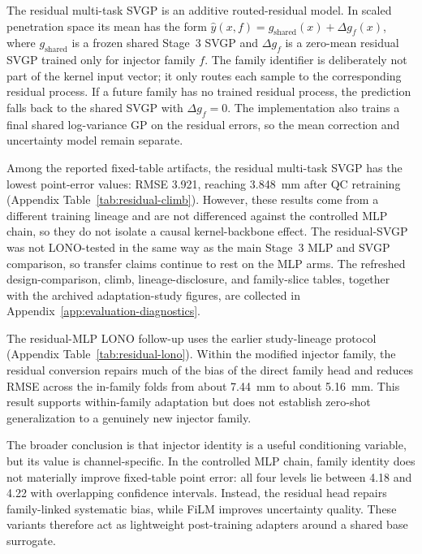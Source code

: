 The residual multi-task SVGP is an additive routed-residual model. In scaled
penetration space its mean has the form
\(\hat{y}(x,f)=g_{\mathrm{shared}}(x)+\Delta g_f(x)\), where
\(g_{\mathrm{shared}}\) is a frozen shared Stage~3 SVGP and \(\Delta g_f\) is a
zero-mean residual SVGP trained only for injector family \(f\). The family
identifier is deliberately not part of the kernel input vector; it only routes
each sample to the corresponding residual process. If a future family has no
trained residual process, the prediction falls back to the shared SVGP with
\(\Delta g_f=0\). The implementation also trains a final shared log-variance GP
on the residual errors, so the mean correction and uncertainty model remain
separate.

Among the reported fixed-table artifacts, the residual multi-task SVGP has the
lowest point-error values: RMSE 3.921, reaching \SI{3.848}{mm} after QC
retraining (Appendix Table~\ref{tab:residual-climb}). However, these results
come from a different training lineage and are not differenced against the
controlled MLP chain, so they do not isolate a causal kernel-backbone effect.
The residual-SVGP was not LONO-tested in the
same way as the main Stage~3 MLP and SVGP comparison, so transfer claims
continue to rest on the MLP arms. The refreshed design-comparison, climb,
lineage-disclosure, and family-slice tables, together with the archived
adaptation-study figures, are collected in
Appendix~\ref{app:evaluation-diagnostics}.

The residual-MLP LONO follow-up uses the earlier study-lineage protocol
(Appendix Table~\ref{tab:residual-lono}). Within the modified injector family,
the residual conversion repairs much of the bias of the direct family head and
reduces RMSE across the in-family folds from about \SI{7.44}{mm} to about
\SI{5.16}{mm}. This result supports within-family adaptation but does not
establish zero-shot generalization to a genuinely new injector family.

The broader conclusion is that injector identity is a useful conditioning
variable, but its value is channel-specific. In the controlled MLP chain,
family identity does not materially improve fixed-table point error: all four
levels lie between 4.18 and 4.22 with overlapping confidence intervals.
Instead, the residual head repairs family-linked systematic bias, while FiLM
improves uncertainty quality. These variants therefore act as lightweight
post-training adapters around a shared base surrogate.

